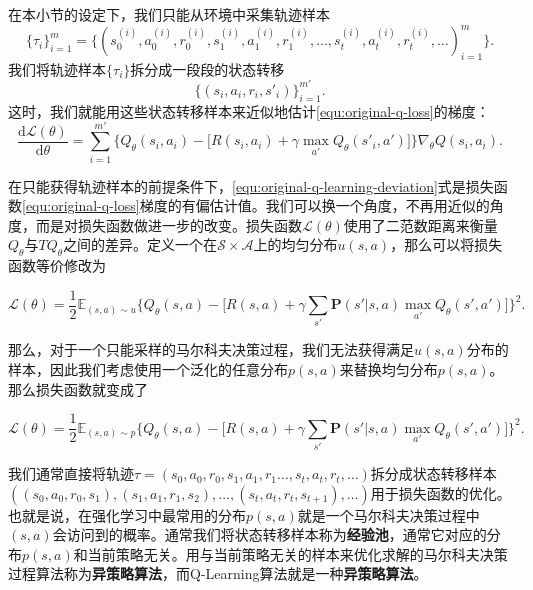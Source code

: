 在本小节的设定下，我们只能从环境中采集轨迹样本
\begin{equation}
    \{\tau_i\}^m_{i=1} = \{(s^{(i)}_0, a^{(i)}_0, r^{(i)}_0, s^{(i)}_1, a^{(i)}_1, r^{(i)}_1, \ldots, s^{(i)}_t, a^{(i)}_t, r^{(i)}_t, \ldots)^{m}_{i=1}\}.
\end{equation}
我们将轨迹样本$\{\tau_i\}$拆分成一段段的状态转移
\begin{equation}
    \{(s_i, a_i, r_i, s'_i)\}^{m'}_{i=1}.
\end{equation}
这时，我们就能用这些状态转移样本来近似地估计\eqref{equ:original-q-loss}的梯度：
\begin{equation}\label{equ:original-q-learning-deviation}
    \frac{\mathrm{d} \mathcal{L}(\theta)}{\mathrm{d} \theta}
    = \sum^{m'}_{i=1} \bigg\{ Q_\theta(s_i, a_i)
    - \bigg[R(s_i, a_i) + \gamma \max_{a'} Q_\theta(s'_i, a')\bigg]\bigg\} \nabla_{\theta} Q(s_i, a_i).
\end{equation}

在只能获得轨迹样本的前提条件下，\eqref{equ:original-q-learning-deviation}式是损失函数\eqref{equ:original-q-loss}梯度的有偏估计值。我们可以换一个角度，不再用近似的角度，而是对损失函数做进一步的改变。损失函数$\mathcal{L}(\theta)$使用了二范数距离来衡量$Q_\theta$与$TQ_\theta$之间的差异。定义一个在$\mathcal{S}\times\mathcal{A}$上的均匀分布$u(s, a)$，那么可以将损失函数等价修改为

\begin{equation}
    \mathcal{L}(\theta) = \frac{1}{2}\mathbb{E}_{(s, a) \sim u} 
    \bigg\{ Q_\theta(s, a)
    - \bigg[R(s, a) + \gamma \sum_{s'}\mathbf{P}(s' \vert s, a)
    \max_{a'} Q_\theta(s', a')\bigg]\bigg\}^2.
\end{equation}

那么，对于一个只能采样的马尔科夫决策过程，我们无法获得满足$u(s, a)$分布的样本，因此我们考虑使用一个泛化的任意分布$p(s, a)$来替换均匀分布$p(s, a)$。那么损失函数就变成了

\begin{equation}
    \mathcal{L}(\theta) = \frac{1}{2}\mathbb{E}_{(s, a) \sim p} 
    \bigg\{ Q_\theta(s, a)
    - \bigg[R(s, a) + \gamma \sum_{s'}\mathbf{P}(s' \vert s, a)
    \max_{a'} Q_\theta(s', a')\bigg]\bigg\}^2.
\end{equation}

我们通常直接将轨迹$\tau = (s_0, a_0, r_0, s_1, a_1, r_1 \ldots, s_t, a_t, r_t, \ldots)$拆分成状态转移样本$((s_0, a_0, r_0, s_1), (s_1, a_1, r_1, s_2), \ldots, (s_t, a_t, r_t, s_{t+1}), \ldots)$用于损失函数的优化。也就是说，在强化学习中最常用的分布$p(s,a)$就是一个马尔科夫决策过程中$(s, a)$会访问到的概率。通常我们将状态转移样本称为\textbf{经验池}，通常它对应的分布$p(s, a)$和当前策略无关。用与当前策略无关的样本来优化求解的马尔科夫决策过程算法称为\textbf{异策略算法}，而Q-Learning算法就是一种\textbf{异策略算法}。

